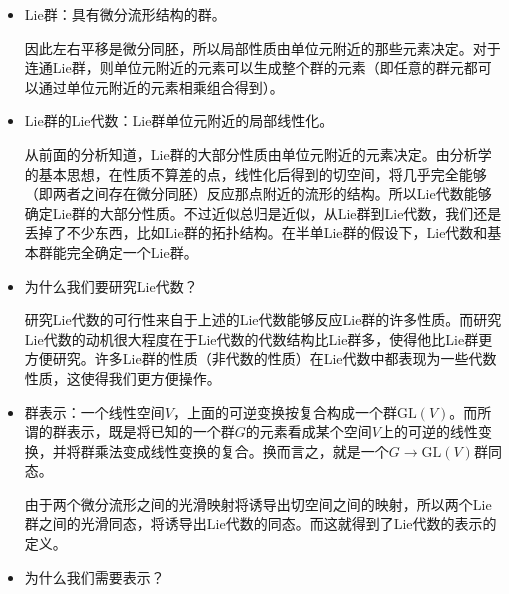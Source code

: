 \documentclass[9pt]{extarticle}
\begin{document}
\begin{itemize}

\item Lie群：具有微分流形结构的群。

因此左右平移是微分同胚，所以局部性质由单位元附近的那些元素决定。对于连通Lie群，则单位元附近的元素可以生成整个群的元素（即任意的群元都可以通过单位元附近的元素相乘组合得到）。

\item Lie群的Lie代数：Lie群单位元附近的局部线性化。

从前面的分析知道，Lie群的大部分性质由单位元附近的元素决定。由分析学的基本思想，在性质不算差的点，线性化后得到的切空间，将几乎完全能够（即两者之间存在微分同胚）反应那点附近的流形的结构。所以Lie代数能够确定Lie群的大部分性质。不过近似总归是近似，从Lie群到Lie代数，我们还是丢掉了不少东西，比如Lie群的拓扑结构。在半单Lie群的假设下，Lie代数和基本群能完全确定一个Lie群。

\item 为什么我们要研究Lie代数？

研究Lie代数的可行性来自于上述的Lie代数能够反应Lie群的许多性质。而研究Lie代数的动机很大程度在于Lie代数的代数结构比Lie群多，使得他比Lie群更方便研究。许多Lie群的性质（非代数的性质）在Lie代数中都表现为一些代数性质，这使得我们更方便操作。

\item 群表示：一个线性空间$V$，上面的可逆变换按复合构成一个群$\mathrm{GL}(V)$。而所谓的群表示，既是将已知的一个群$G$的元素看成某个空间$V$上的可逆的线性变换，并将群乘法变成线性变换的复合。换而言之，就是一个$G\to \mathrm{GL}(V)$群同态。

由于两个微分流形之间的光滑映射将诱导出切空间之间的映射，所以两个Lie群之间的光滑同态，将诱导出Lie代数的同态。而这就得到了Lie代数的表示的定义。

\item 为什么我们需要表示？


\end{itemize}
\end{document}
